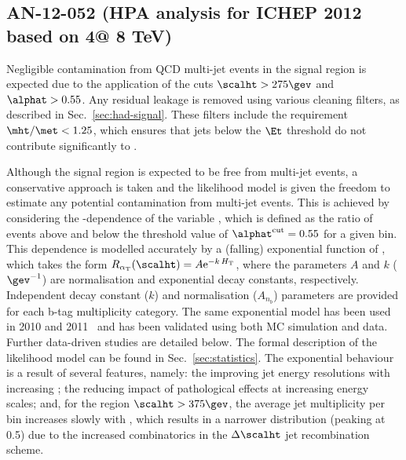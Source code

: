 
\clearpage
\subsection{AN-12-052 (HPA analysis for ICHEP 2012 based on 4\fbinv @ 8 TeV)}

Negligible contamination from QCD multi-jet events in the signal
region is expected due to the application of the cuts $\scalht >
275\gev$ and $\alphat > 0.55$. Any residual leakage is removed using
various cleaning filters, as described in
Sec.~\ref{sec:had-signal}. These filters include the requirement
$\mht/\met < 1.25$, which ensures that jets below the $\Et$ threshold
do not contribute significantly to \mht.

Although the signal region is expected to be free from multi-jet
events, a conservative approach is taken and the likelihood model is
given the freedom to estimate any potential contamination from
multi-jet events. This is achieved by considering the
\scalht-dependence of the variable \RaT, which is defined as the ratio
of events above and below the threshold value of $\alphat^{\rm
  cut}=0.55$ for a given \scalht bin. This dependence is modelled
accurately by a (falling) exponential function of \scalht, which takes
the form $\RaT(\scalht) = A\mathrm{e}^{-k \, H_\text{T}}$, where the
parameters $A$ and $k$ ($\gev^{-1}$) are normalisation and exponential
decay constants, respectively. Independent decay constant ($k$) and
normalisation ($A_{n_b}$) parameters are provided for each b-tag
multiplicity category. The same exponential model has been used in
2010 and 2011~\cite{RA1Paper2011,RA1Paper,RA1PAS2011} and has been
validated using both MC simulation and data. Further data-driven
studies are detailed below. The formal description of the likelihood
model can be found in Sec.~\ref{sec:statistics}. The exponential
behaviour is a result of several features, namely: the improving jet
energy resolutions with increasing \scalht; the reducing impact of
pathological effects at increasing energy scales; and, for the region
$\scalht > 375\gev$, the average jet multiplicity per bin increases
slowly with \scalht, which results in a narrower \alphat distribution
(peaking at 0.5) due to the increased combinatorics in the
$\Delta\scalht$ jet recombination scheme.

